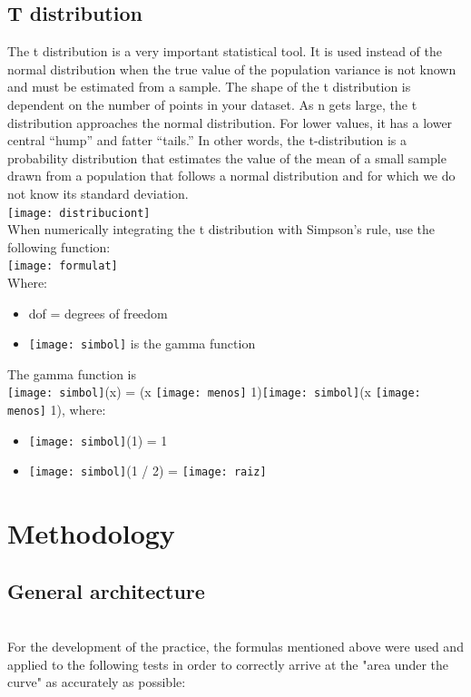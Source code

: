 \documentclass{article}
\begin{document}
\subsection{T distribution}
{The t distribution is a very important statistical tool. It is used instead of the normal distribution when the true value of the population variance is not known and must be estimated from a sample.}
{The shape of the t distribution is dependent on the number of points in your dataset. As n gets large, the t distribution approaches the normal distribution. For lower values, it has a lower central “hump” and fatter “tails.”}
{In other words, the t-distribution is a probability distribution that estimates the value of the mean of a small sample drawn from a population that follows a normal distribution and for which we do not know its standard deviation.\\}
\texttt{[image: distribuciont]}
{\\When numerically integrating the t distribution with Simpson’s rule, use the following function: \\}
\texttt{[image: formulat]}
{\\Where:}
\begin{itemize}
\item dof = degrees of freedom
\item \texttt{[image: simbol]} is the gamma function
\end{itemize}
{The gamma function is}
{\\ \texttt{[image: simbol]}(x) = (x \texttt{[image: menos]} 1)\texttt{[image: simbol]}(x \texttt{[image: menos]} 1), where: }
\begin{itemize}
\item  \texttt{[image: simbol]}(1) = 1
\item \texttt{[image: simbol]}(1 / 2) = \texttt{[image: raiz]}
\end{itemize}
\section{Methodology}
\subsection{General architecture}
{\\For the development of the practice, the formulas mentioned above were used and applied to the following tests in order to correctly arrive at the "area under the curve" as accurately as possible:}
\end{document}
